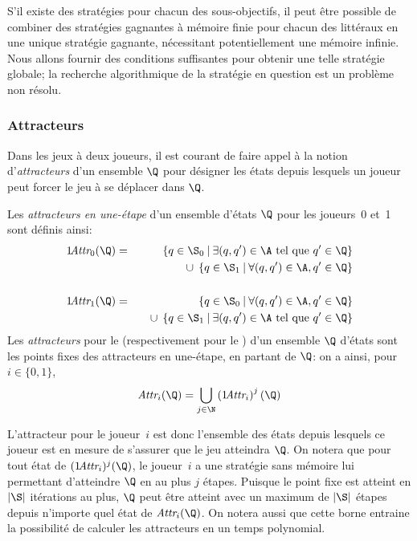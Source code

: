 S'il existe des stratégies pour chacun des sous-objectifs, il peut être possible de combiner des stratégies gagnantes à mémoire finie pour chacun des littéraux en une unique stratégie gagnante, nécessitant potentiellement une mémoire infinie.
Nous allons fournir des conditions suffisantes pour obtenir une telle stratégie globale; la recherche algorithmique de la stratégie en question est un problème non résolu.

\subsubsection{Attracteurs}

Dans les jeux à deux joueurs, il est courant de faire appel à la notion d'\emph{attracteurs} d'un ensemble $\Q$ pour désigner les états depuis lesquels un joueur peut forcer le jeu à se déplacer dans $\Q$.

\begin{definition}
Les \emph{attracteurs en une-étape} d'un ensemble d'états $\Q$ pour les joueurs~0 et~1 sont définis ainsi:
\begin{eqnarray*}
1\!\attractor{0}(\Q) & = & \left\{q \in \S_0 \mmid \exists (q,q') \in \A \textrm{ tel que } q' \in \Q \right\}             \\
                    &   & \quad\cup \;\left\{q \in \S_1 \mmid \forall (q,q') \in \A, q' \in \Q \right\}                    \\
                    &   &                                                                                                  \\
1\!\attractor{1}(\Q) & = & \left\{q \in \S_0 \mmid \forall (q,q') \in \A, q' \in \Q \right\}                               \\
                    &   & \quad \cup \;\left\{q \in \S_1 \mmid \exists (q,q') \in \A \textrm{ tel que } q' \in \Q \right\}
\end{eqnarray*}
Les \emph{attracteurs} pour le \jo (respectivement pour le \ji) d'un ensemble $\Q$ d'états sont les points fixes des attracteurs en une-étape, en partant de $\Q$: on a ainsi, pour $i \in \{0,1\}$, \[\attractor{i}(\Q) = \bigcup_{j \in \N} \left(1\!\attractor{i}\right)^j(\Q)\]
\end{definition}
L'attracteur pour le joueur~$i$ est donc l'ensemble des états depuis lesquels ce joueur est en mesure de s'assurer que le jeu atteindra $\Q$.
On notera que pour tout état de $(1\!\attractor{i})^j(\Q)$, le joueur~$i$ a une stratégie sans mémoire lui permettant d'atteindre $\Q$ en au plus $j$ étapes.
Puisque le point fixe est atteint en $|\S|$ itérations au plus, $\Q$ peut être atteint avec un maximum de $|\S|$ étapes depuis n'importe quel état de $\attractor{i}(\Q)$.
On notera aussi que cette borne entraine la possibilité de calculer les attracteurs en un temps polynomial.

